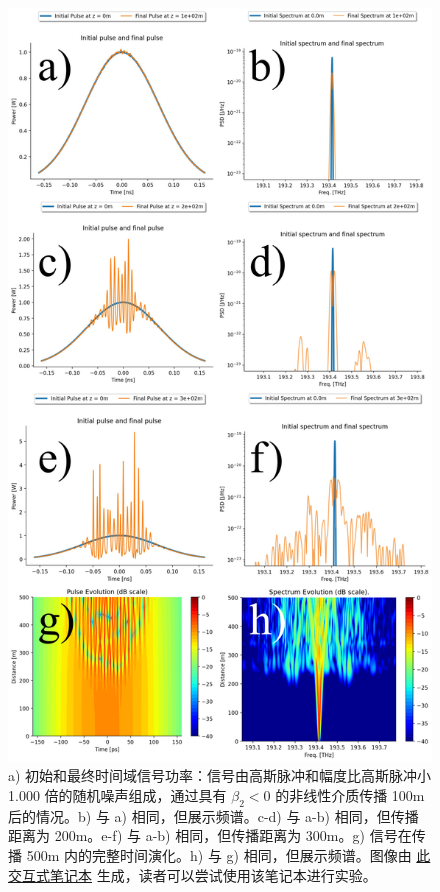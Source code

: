 \begin{figure}
    \centering
    \includegraphics[width=0.75\linewidth]{figures/MI_combined.png}
    \caption{a) 初始和最终时间域信号功率：信号由高斯脉冲和幅度比高斯脉冲小 1.000 倍的随机噪声组成，通过具有 $\beta_2<0$ 的非线性介质传播 100m 后的情况。b) 与 a) 相同，但展示频谱。c-d) 与 a-b) 相同，但传播距离为 200m。e-f) 与 a-b) 相同，但传播距离为 300m。g) 信号在传播 500m 内的完整时间演化。h) 与 g) 相同，但展示频谱。图像由 \href{https://colab.research.google.com/drive/1p2aQZ4zPPAIMplVxvlezdmpQt_j-rsY7?usp=sharing}{此交互式笔记本} 生成，读者可以尝试使用该笔记本进行实验。}
    \label{fig:MI}
\end{figure}




